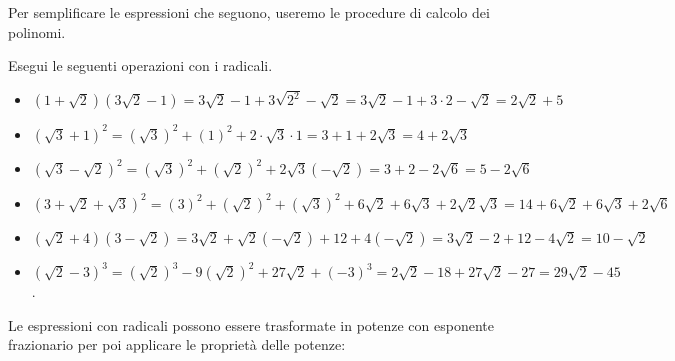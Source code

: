 Per semplificare le espressioni che seguono, useremo le procedure di calcolo 
dei polinomi.
\begin{exrig}
 \begin{esempio}
Esegui le seguenti operazioni con i radicali.
\begin{itemize}
 \item $(1+\sqrt 2)(3\sqrt 2-1)=3\sqrt 2-1+3\sqrt {2^2}-\sqrt 2=
        3\sqrt 2-1+3\cdot 2-\sqrt 2=2\sqrt 2+5$
 \item $(\sqrt 3+1)^2=(\sqrt 3)^2+(1)^2+2\cdot \sqrt 3\cdot 1=
        3+1+2\sqrt 3=4+2\sqrt 3$
 \item $(\sqrt 3-\sqrt 2)^2=(\sqrt 3)^2+(\sqrt 2)^2+2 \sqrt 3 (-\sqrt 2)=
        3+2-2\sqrt 6=5-2\sqrt 6$
 \item $(3+\sqrt 2+\sqrt 3)^2=
        (3)^2+(\sqrt 2)^2+(\sqrt 3)^2+6 \sqrt 2+6 \sqrt 3+2 \sqrt 2 \sqrt 3=
        14+6\sqrt 2+6\sqrt 3+2\sqrt 6$
 \item $(\sqrt 2+4)(3-\sqrt 2)=3\sqrt 2 +\sqrt 2(-\sqrt 2)+12+4(-\sqrt 2)=
        3\sqrt 2-2+12-4\sqrt 2=10-\sqrt 2$
 \item $(\sqrt 2-3)^3=(\sqrt 2)^3-9(\sqrt 2)^2+27\sqrt 2+(-3)^3=
        2\sqrt 2-18+27\sqrt 2-27=29\sqrt 2-45$.
\end{itemize}
 \end{esempio}
\end{exrig}

Le espressioni con radicali possono essere trasformate in potenze con 
esponente frazionario per poi applicare le proprietà delle potenze:

